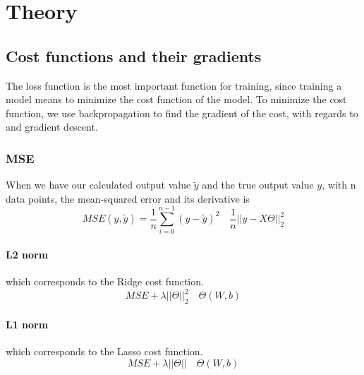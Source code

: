 \section{Theory}
\label{sec:theory}
\subsection{Cost functions and their gradients}
The loss function is the most important function 
for training, since training a model
means to minimize the cost function of the model.  
To minimize the cost function, we use backpropagation
to find the gradient of the cost, with regards
to  and gradient descent.

\subsubsection{MSE}
When we have our calculated output value $\tilde{y}$ and the true
output value $y$, with n data points, the mean-squared error and its derivative is
\begin{equation}
    MSE(y,\tilde{y}) = \frac{1}{n}\sum_{i=0}^{n-1}(y - \tilde{y})^2 \quad 
    \frac{1}{n}||y - X\Theta||_2^2
    \label{eq: MSE}
\end{equation}
\paragraph{L2 norm} which corresponds to the Ridge cost function.
\begin{equation}
    MSE + \lambda||\Theta||_2^2 \quad \Theta(W, b)
    \label{eq: RidgeCost}
\end{equation}
\paragraph{L1 norm} which corresponds to the Lasso cost function.
\begin{equation}
    MSE + \lambda||\Theta|| \quad \Theta(W, b)
    \label{eq: LassoCost}
\end{equation}
\cite[p.~86-91]{LectureNotes}

